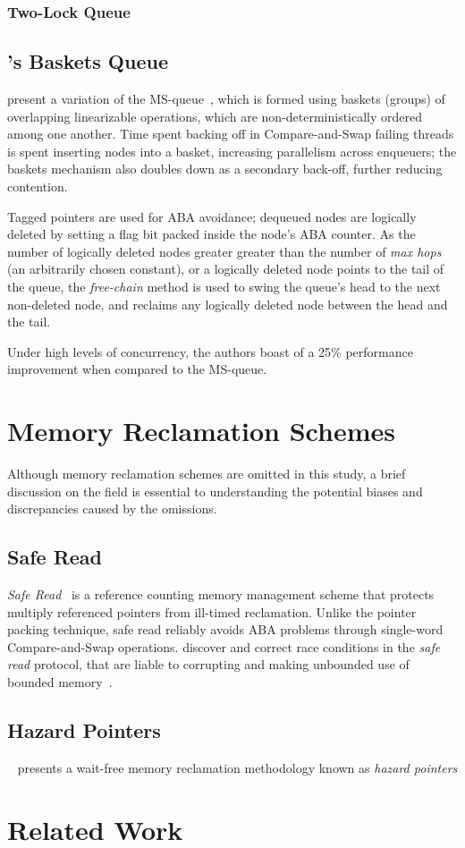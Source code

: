 \subsubsection{Two-Lock Queue}

\subsection{\citeauthor{hoffman2007baskets}'s Baskets Queue}
\citeauthor{hoffman2007baskets} present a variation of the MS-queue~\citep{hoffman2007baskets}, which is formed
using baskets (groups) of overlapping linearizable operations, which are non-deterministically
ordered among one another.
Time spent backing off in Compare-and-Swap failing threads is
spent inserting nodes into a basket, increasing parallelism across enqueuers;
the baskets mechanism also doubles down as a secondary back-off, further reducing contention.

Tagged pointers are used for ABA avoidance; dequeued nodes are logically
deleted by setting a flag bit packed inside the node's ABA counter. 
As the number of logically deleted nodes greater greater than the number of
\emph{max hops} (an arbitrarily chosen constant), or a logically deleted node
points to the tail of the queue, the \emph{free-chain} method is used to swing
the queue's head to the next non-deleted node, and reclaims any logically
deleted node between the head and the tail.

Under high levels of concurrency, the authors boast of a 25\% performance
improvement when compared to the MS-queue.

\section{Memory Reclamation Schemes}
Although memory reclamation schemes are omitted in this study, a brief discussion
on the field is essential to understanding the potential biases and discrepancies caused
by the omissions.

\subsection{Safe Read}
\emph{Safe Read}~\citep{valois1994queues,valois1995datastructures} 
is a reference counting memory management scheme that protects multiply referenced
pointers from ill-timed reclamation. 
Unlike the pointer packing technique, safe read reliably avoids ABA problems through
single-word Compare-and-Swap operations. \citeauthor{michael1995correction} discover
and correct race conditions in the \emph{safe read} protocol, that are liable to
corrupting and making unbounded use of bounded memory~\citep{michael1995correction}.

\subsection{Hazard Pointers}
\citeauthor{michael2004hazard}~\citep{michael2004hazard} presents a wait-free
memory reclamation methodology known as \emph{hazard pointers}

\section{Related Work}
